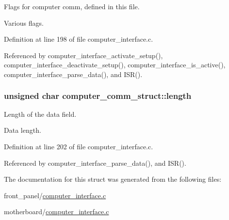 Flags for computer comm, defined in this file. 

Various flags. 

Definition at line 198 of file computer\_\-interface.c.

Referenced by computer\_\-interface\_\-activate\_\-setup(), computer\_\-interface\_\-deactivate\_\-setup(), computer\_\-interface\_\-is\_\-active(), computer\_\-interface\_\-parse\_\-data(), and ISR().\hypertarget{structcomputer__comm__struct_530bb985c095839ba3634e0642ed3bda}{
\subsubsection[{length}]{\setlength{\rightskip}{0pt plus 5cm}unsigned char {\bf computer\_\-comm\_\-struct::length}}}
\label{structcomputer__comm__struct_530bb985c095839ba3634e0642ed3bda}


Length of the data field. 

Data length. 

Definition at line 202 of file computer\_\-interface.c.

Referenced by computer\_\-interface\_\-parse\_\-data(), and ISR().

The documentation for this struct was generated from the following files:\begin{CompactItemize}
\item 
front\_\-panel/\hyperlink{front__panel_2computer__interface_8c}{computer\_\-interface.c}\item 
motherboard/\hyperlink{motherboard_2computer__interface_8c}{computer\_\-interface.c}\end{CompactItemize}
